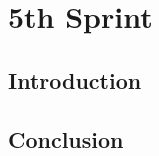 \graphicspath{{./assets/}}
\setcounter{mtc}{5}
\chapter{ 5th Sprint }

\minitoc
\newpage
\section*{Introduction}



\section*{Conclusion}
